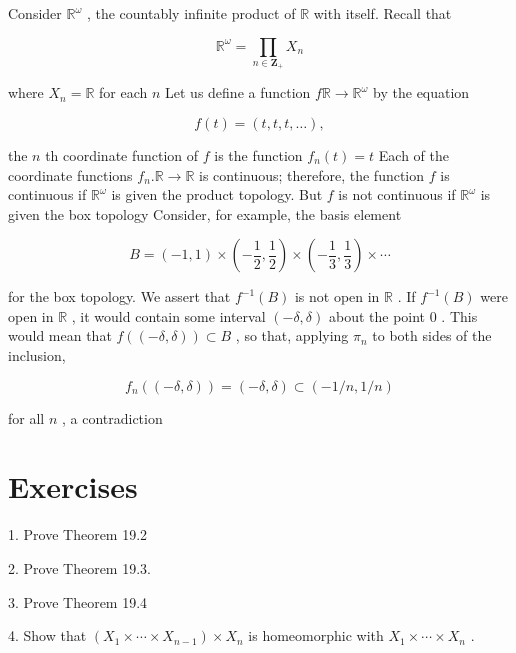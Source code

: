\begin{example} Consider \({\mathbb{R}}^{\omega }\) , the countably infinite product of \(\mathbb{R}\) with itself. Recall that

\[
{\mathbb{R}}^{\omega } = \mathop{\prod }\limits_{{n \in  {\mathbf{Z}}_{ + }}}{X}_{n}
\]

where \({X}_{n} = \mathbb{R}\) for each \(n\) Let us define a function \(f\mathbb{R} \rightarrow  {\mathbb{R}}^{\omega }\) by the equation

\[
f\left( t\right)  = \left( {t,t,t,\ldots }\right) ,
\]

the \(n\) th coordinate function of \(f\) is the function \({f}_{n}\left( t\right)  = t\) Each of the coordinate functions \({f}_{n}.\mathbb{R} \rightarrow  \mathbb{R}\) is continuous; therefore, the function \(f\) is continuous if \({\mathbb{R}}^{\omega }\) is given the product topology. But \(f\) is not continuous if \({\mathbb{R}}^{\omega }\) is given the box topology Consider, for example, the basis element

\[
B = \left( {-1,1}\right)  \times  \left( {-\frac{1}{2},\frac{1}{2}}\right)  \times  \left( {-\frac{1}{3},\frac{1}{3}}\right)  \times  \cdots
\]

for the box topology. We assert that \({f}^{-1}\left( B\right)\) is not open in \(\mathbb{R}\) . If \({f}^{-1}\left( B\right)\) were open in \(\mathbb{R}\) , it would contain some interval \(\left( {-\delta ,\delta }\right)\) about the point 0 . This would mean that \(f\left( \left( {-\delta ,\delta }\right) \right)  \subset  B\) , so that, applying \({\pi }_{n}\) to both sides of the inclusion,

\[
{f}_{n}\left( \left( {-\delta ,\delta }\right) \right)  = \left( {-\delta ,\delta }\right)  \subset  \left( {-1/n,1/n}\right)
\]

for all \(n\) , a contradiction
\end{example}

\section*{Exercises}

1. Prove Theorem 19.2

2. Prove Theorem 19.3.

3. Prove Theorem 19.4

4. Show that \(\left( {{X}_{1} \times  \cdots  \times  {X}_{n - 1}}\right)  \times  {X}_{n}\) is homeomorphic with \({X}_{1} \times  \cdots  \times  {X}_{n}\) .


